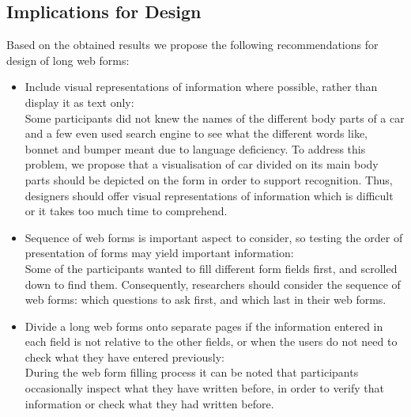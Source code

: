 \documentclass[../main/Replicate.tex]{subfiles}
\begin{document}
	\subsection{Implications for Design}
	Based on the obtained results we propose the following recommendations for design of long web forms:
	\begin{itemize}
		\item Include visual representations of information where possible, rather than display it as text only:\\
		Some participants did not knew the names of the different body parts of a car and a few even used search engine to see what the different words like, bonnet and bumper meant due to language deficiency. To address this problem, we propose that a visualisation of car divided on its main body parts should be depicted on the form in order to support recognition. Thus, designers should offer visual representations of information which is difficult or it takes too much time to comprehend.
		
		\item Sequence of web forms is important aspect to consider, so testing the order of presentation of forms may yield important information:\\
		Some of the participants wanted to fill different form fields first, and scrolled down to find them. Consequently, researchers should consider the sequence of web forms: which questions to ask first, and which last in their web forms.
		
		\item Divide a long web forms onto separate pages if the information entered in each field is not relative to the other fields, or when the users do not need to check what they have entered previously:\\
		During the web form filling process it can be noted that participants occasionally inspect what they have written before, in order to verify that information or check what they had written before. 
	\end{itemize}
	
\end{document}
